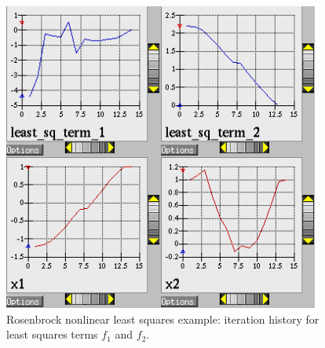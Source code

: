 \begin{figure}[ht!]
  \centering
  \includegraphics[height=4in]{images/nonlin_paramest_hist}
  \caption{Rosenbrock nonlinear least squares example: iteration
    history for least squares terms $f_1$ and $f_2$.}
  \label{additional:rosenbrock_nls_graphics}
\end{figure}

\clearpage
